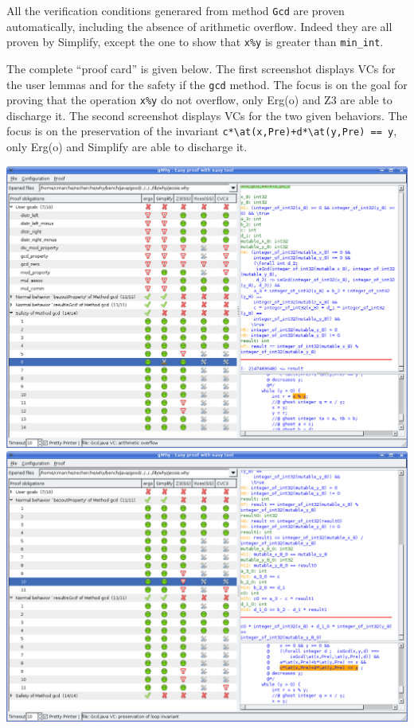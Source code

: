 \documentclass[a4paper,12pt]{article}
\begin{document}
All the verification conditions generared from method \verb|Gcd| are
proven automatically, including the absence of arithmetic
overflow. Indeed they are all proven by Simplify, except the one to
show that \verb|x%y| is greater than \verb|min_int|. 

The complete ``proof card'' is given below. The first screenshot
displays VCs for the user lemmas and for the safety if the \verb|gcd|
method. The focus is on the goal for proving that the operation
\verb|x%y| do not overflow, only Erg(o) and Z3 are able to discharge it. The
second screenshot displays VCs for the two given behaviors. The focus
is on the preservation of the invariant
\verb|c*\at(x,Pre)+d*\at(y,Pre) == y|, only Erg(o) and Simplify are able to
discharge it.

\clearpage

\begin{center}
  \vspace*{-0.07\textheight}
  \hspace*{-0.04\textwidth}\includegraphics[width=1.08\textwidth]{Gcd1.png}
  \vfill
  \hspace*{-0.04\textwidth}\includegraphics[width=1.08\textwidth]{Gcd2.png}
  \vspace*{-0.07\textheight}
\end{center}
\end{document}
